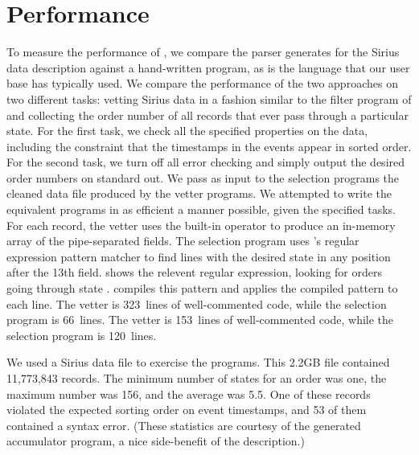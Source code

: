 \documentclass[times]{acm-sigplan}
\newcommand{\dibbler}{Sirius}
\begin{document}
\section{Performance}
To measure the performance of \pads{}, we compare the parser \pads{} generates for the \dibbler{} data description against a hand-written \perl{} program, as \perl{} is the language that our user base has typically used. We compare the performance of the two approaches on two different tasks: vetting \dibbler{} data in a fashion similar to the filter program of
 and collecting the order number of all records that ever pass through a particular state.  For the first task, we check all the specified properties on the data, including the constraint that the timestamps in the events appear in sorted order.  For the second task, we turn off all error checking and simply output the desired order numbers on standard out.
We pass as input to the selection programs the cleaned data file produced by the vetter programs. 
We attempted to write the equivalent \perl{} programs in as efficient a manner possible, given the specified tasks.  For each record, the \perl{} vetter uses the built-in  operator to produce an in-memory array of the pipe-separated fields.  The \perl{} selection program uses \perl{}'s regular expression pattern matcher to find lines with the desired state in any 
position after the 13th field.   shows the relevent regular expression, looking for orders going through state .
\perl{} compiles this pattern and applies the compiled pattern to each line.  The \perl{} vetter is 323~lines of well-commented \perl{} code, while the selection program is 66~lines.  
The \pads{} vetter is 153~lines of well-commented \C{} code, while the \pads{} selection program is 120~lines. 


We used a \dibbler{} data file to exercise the programs.  This 2.2GB file contained 11,773,843 records.  The minimum number of states for an order was one, the maximum number was 156, and the average was 5.5.  One of these records violated the expected sorting order on event timestamps, and 53 of them contained a syntax error.
(These statistics are courtesy of the generated \pads{} accumulator program, a nice side-benefit of the \pads{} description.)  
\end{document}
